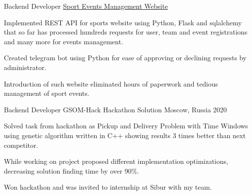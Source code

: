 

\begin{cventries}

  \cventry
  {Backend Developer} %
  {\href{https://github.com/SphericalPotatoInVacuum/lksh_sport}{Sport Events Management Website}} %
  {} %
  {} %
  {
    \begin{cvitems} %
      \item Implemented REST API for sports website using Python, Flask and sqlalchemy that so far has processed hundreds requests for user,
      team and event registrations and many more for events management.
      \item Created telegram bot using Python for ease of approving or declining requests by administrator.
      \item Introduction of such website eliminated hours of paperwork and tedious management of sport events.
    \end{cvitems}
  }


  \cventry
  {Backend Developer} %
  {GSOM-Hack Hackathon Solution} %
  {Moscow, Russia} %
  {2020} %
  {
    \begin{cvitems}
      \item Solved task from hackathon as Pickup and Delivery Problem with Time Windows using
      genetic algorithm written in C++ showing results 3 times better than next competitor.
      \item While working on project proposed different implementation optimizations, decreasing solution finding time by over 90\%.
      \item Won hackathon and was invited to internship at Sibur with my team.
    \end{cvitems}
  }
\end{cventries}
